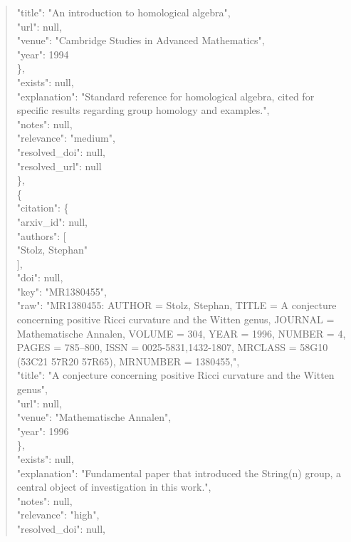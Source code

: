 \documentclass[11pt]{article}
\begin{document}
\begin{quote}
        "title": "An introduction to homological algebra",\\
        "url": null,\\
        "venue": "Cambridge Studies in Advanced Mathematics",\\
        "year": 1994\\
      \},\\
      "exists": null,\\
      "explanation": "Standard reference for homological algebra, cited for specific results regarding group homology and examples.",\\
      "notes": null,\\
      "relevance": "medium",\\
      "resolved\_doi": null,\\
      "resolved\_url": null\\
    \},\\
    \{\\
      "citation": \{\\
        "arxiv\_id": null,\\
        "authors": [\\
          "Stolz, Stephan"\\
        ],\\
        "doi": null,\\
        "key": "MR1380455",\\
        "raw": "MR1380455: AUTHOR = Stolz, Stephan, TITLE = A conjecture concerning positive Ricci curvature and the Witten genus, JOURNAL = Mathematische Annalen, VOLUME = 304, YEAR = 1996, NUMBER = 4, PAGES = 785--800, ISSN = 0025-5831,1432-1807, MRCLASS = 58G10 (53C21 57R20 57R65), MRNUMBER = 1380455,",\\
        "title": "A conjecture concerning positive Ricci curvature and the Witten genus",\\
        "url": null,\\
        "venue": "Mathematische Annalen",\\
        "year": 1996\\
      \},\\
      "exists": null,\\
      "explanation": "Fundamental paper that introduced the String(n) group, a central object of investigation in this work.",\\
      "notes": null,\\
      "relevance": "high",\\
      "resolved\_doi": null,\\

\end{quote}
\end{document}
